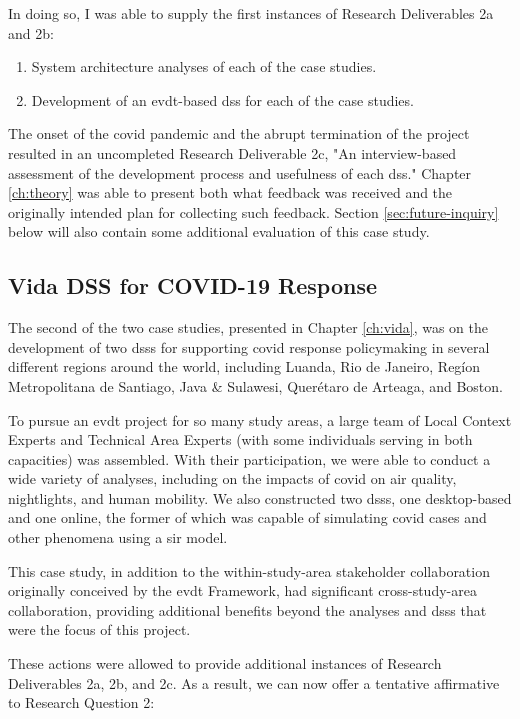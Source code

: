 In doing so, I was able to supply the first instances of Research Deliverables 2a and 2b:

\begin{enumerate}[label=\emph{\alph*},itemsep=0pt,parsep=0pt]
	\item{System architecture analyses of each of the case studies.} 
	\item{Development of an \ac{evdt}-based \ac{dss} for each of the case studies.} 
\end{enumerate}

The onset of the \ac{covid} pandemic and the abrupt termination of the project resulted in an uncompleted Research Deliverable 2c, "An interview-based assessment of the development process and usefulness of each \ac{dss}." Chapter \ref{ch:theory} was able to present both what feedback was received and the originally intended plan for collecting such feedback. Section \ref{sec:future-inquiry} below will also contain some additional evaluation of this case study.

\subsection{Vida DSS for COVID-19 Response}

The second of the two case studies, presented in Chapter \ref{ch:vida}, was on the development of two \acp{dss} for supporting \ac{covid} response policymaking in several different regions around the world, including Luanda, Rio de Janeiro, Regíon Metropolitana de Santiago, Java \& Sulawesi, Querétaro de Arteaga, and Boston. 

To pursue an \ac{evdt} project for so many study areas, a large team of Local Context Experts and Technical Area Experts (with some individuals serving in both capacities) was assembled. With their participation, we were able to conduct a wide variety of analyses, including on the impacts of \ac{covid} on air quality, nightlights, and human mobility. We also constructed two \acp{dss}, one desktop-based and one online, the former of which was capable of simulating \ac{covid} cases and other phenomena using a \acf{sir} model. 

This case study, in addition to the within-study-area stakeholder collaboration originally conceived by the \ac{evdt} Framework, had significant cross-study-area collaboration, providing additional benefits beyond the analyses and \acp{dss} that were the focus of this project. 

These actions were allowed to provide additional instances of Research Deliverables 2a, 2b, and 2c. As a result, we can now offer a tentative affirmative to Research Question 2:

